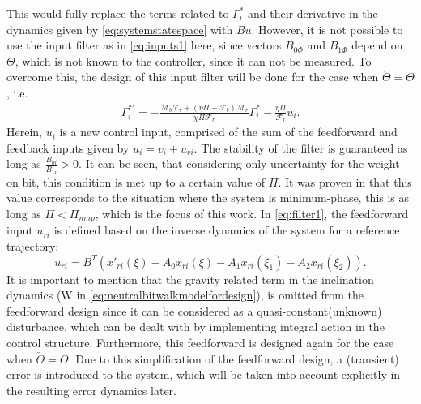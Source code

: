 \documentclass[../main.tex]{subfiles}
\begin{document}
	This would fully replace the terms related to $\Gamma_i^*$ and their derivative in the dynamics given by \eqref{eq:systemstatespace} with $Bu$. However, it is not possible to use the input filter as in \eqref{eq:inputs1} here, since vectors $B_{0\Phi}$ and $B_{1\Phi}$ depend on $\Theta$, which is not known to the controller, since it can not be measured. To overcome this, the design of this input filter will be done for the case when $\check{\Theta} = \Theta$, i.e.
	\begin{align}
	\Gamma_{i}^{*'} = -\frac{\mathcal{M}_b \mathcal{F}_r + (\eta \Pi - \mathcal{F}_b)\mathcal{M}_r}{\chi \Pi \mathcal{F}_r}\Gamma_{i}^{*} - \frac{\eta \Pi}{\mathcal{F}_r}u_i. \label{eq:filter1} 	
	\end{align}	
	Herein, $u_i$ is a new control input, comprised of the sum of the feedforward and feedback inputs given by $u_i = v_i + u_{ri}$. The stability of the filter is guaranteed as long as $\frac{B_{0i}}{B_{1i}} > 0$. It can be seen, that considering only uncertainty for the weight on bit, this condition is met up to a certain value of $\Pi$. It was proven in \cite{Kremers2013} that this value corresponds to the situation where the system is minimum-phase, this is as long as $\Pi < \Pi_{nmp}$, which is the focus of this work. In \eqref{eq:filter1}, the feedforward input $u_{ri}$ is defined based on the inverse dynamics of the system for a reference trajectory:
	\begin{equation}
	u_{ri} = B^T (x'_{ri}(\xi) - A_0 x_{ri}(\xi) - A_1 x_{ri}(\xi_1) - A_2 x_{ri}(\xi_2)).
	\label{eq:feedforward}
	\end{equation}
	It is important to mention that the gravity related term in the inclination dynamics (W in \eqref{eq:neutralbitwalkmodelfordesign}), is omitted from the feedforward design since it can be considered as a quasi-constant(unknown) disturbance, which can be dealt with by implementing integral action in the control structure. Furthermore, this feedforward is designed again for the case when $\check{\Theta} = \Theta$. Due to this simplification of the feedforward design, a (transient) error is introduced to the system, which will be taken into account explicitly in the resulting error dynamics later.
\end{document}
